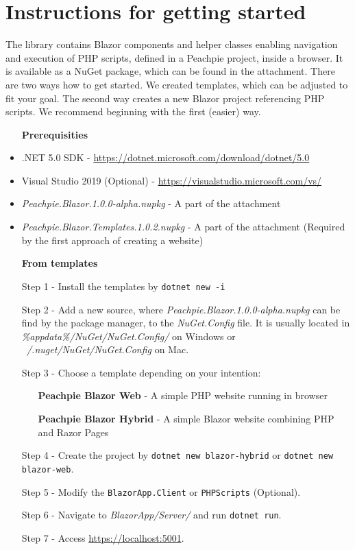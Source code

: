 \chapter{Instructions for getting started}

The library contains Blazor components and helper classes enabling navigation and execution of PHP scripts, defined in a Peachpie project, inside a browser. 
It is available as a NuGet package, which can be found in the attachment. 
There are two ways how to get started. We created templates, which can be adjusted to fit your goal. 
The second way creates a new Blazor project referencing PHP scripts. 
We recommend beginning with the first (easier) way.
\par
\begin{itemize}
\item [\textbf{Prerequisities}]
\item .NET 5.0 SDK - \url{https://dotnet.microsoft.com/download/dotnet/5.0}
\item Visual Studio 2019 (Optional) - \url{https://visualstudio.microsoft.com/vs/}
\item \textit{Peachpie.Blazor.1.0.0-alpha.nupkg} - A part of the attachment
\item \textit{Peachpie.Blazor.Templates.1.0.2.nupkg} - A part of the attachment (Required by the first approach of creating a website)
\end{itemize}
\par
\begin{itemize}
\item [\textbf{From templates}]
\item [Step 1 -] Install the templates by \texttt{dotnet new -i}
\item [Step 2 -] Add a new source, where \textit{Peachpie.Blazor.1.0.0-alpha.nupkg} can be find by the package manager, to the \textit{NuGet.Config} file. It is usually located in \textit{\%appdata\%/NuGet/NuGet.Config/} on Windows or \textit{~/.nuget/NuGet/NuGet.Config} on Mac.
\item [Step 3 -] Choose a template depending on your intention:
\begin{itemize}
\item [\textbf{Peachpie Blazor Web} -] A simple PHP website running in browser
\item [\textbf{Peachpie Blazor Hybrid} -] A simple Blazor website combining PHP and Razor Pages
\end{itemize}
\item [Step 4 -] Create the project by \texttt{dotnet new blazor-hybrid} or \texttt{dotnet new blazor-web}.
\item [Step 5 -] Modify the \texttt{BlazorApp.Client} or \texttt{PHPScripts} (Optional).
\item [Step 6 -] Navigate to \textit{BlazorApp/Server/} and run \texttt{dotnet run}.
\item [Step 7 -] Access \url{https://localhost:5001}.
\end{itemize}
